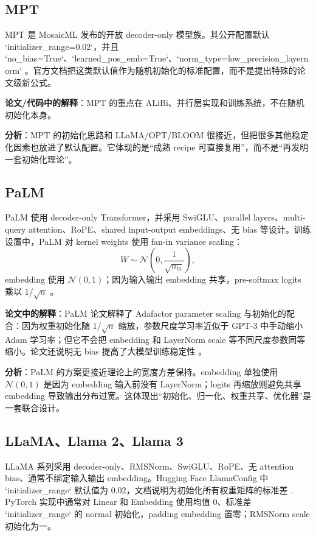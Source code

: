 \documentclass[UTF8,a4paper,11pt]{ctexart}
\newcommand{\Normal}{\mathcal{N}}
\begin{document}
\subsection{MPT}

MPT 是 MosaicML 发布的开放 decoder-only 模型族。其公开配置默认 `initializer\_range=0.02`，并且 `no\_bias=True`、`learned\_pos\_emb=True`、`norm\_type=low\_precision\_layernorm` \cite{mptdocs}。官方文档把这类默认值作为随机初始化的标准配置，而不是提出特殊的论文级新公式。

\textbf{论文/代码中的解释}：MPT 的重点在 ALiBi、并行层实现和训练系统，不在随机初始化本身。

\textbf{分析}：MPT 的初始化思路和 LLaMA/OPT/BLOOM 很接近，但把很多其他稳定化因素也放进了默认配置。它体现的是“成熟 recipe 可直接复用”，而不是“再发明一套初始化理论”。

\subsection{PaLM}

PaLM 使用 decoder-only Transformer，并采用 SwiGLU、parallel layers、multi-query attention、RoPE、shared input-output embeddings、无 bias 等设计。训练设置中，PaLM 对 kernel weights 使用 fan-in variance scaling：
\[
  W\sim \Normal\left(0,\frac{1}{\sqrt{n_{\mathrm{in}}}}\right),
\]
embedding 使用 $\Normal(0,1)$；因为输入输出 embedding 共享，pre-softmax logits 乘以 $1/\sqrt{n}$ \cite{palmpaper}。

\textbf{论文中的解释}：PaLM 论文解释了 Adafactor parameter scaling 与初始化的配合：因为权重初始化随 $1/\sqrt{n}$ 缩放，参数尺度学习率近似于 GPT-3 中手动缩小 Adam 学习率；但它不会把 embedding 和 LayerNorm scale 等不同尺度参数同等缩小。论文还说明无 bias 提高了大模型训练稳定性 \cite{palmpaper}。

\textbf{分析}：PaLM 的方案更接近理论上的宽度方差保持。embedding 单独使用 $\Normal(0,1)$ 是因为 embedding 输入前没有 LayerNorm；logits 再缩放则避免共享 embedding 导致输出分布过宽。这体现出“初始化、归一化、权重共享、优化器”是一套联合设计。

\subsection{LLaMA、Llama 2、Llama 3}

LLaMA 系列采用 decoder-only、RMSNorm、SwiGLU、RoPE、无 attention bias、通常不绑定输入输出 embedding。Hugging Face LlamaConfig 中 `initializer\_range` 默认值为 $0.02$，文档说明为初始化所有权重矩阵的标准差 \cite{llamadocs,llamapaper}. PyTorch 实现中通常对 Linear 和 Embedding 使用均值 0、标准差 `initializer\_range` 的 normal 初始化，padding embedding 置零；RMSNorm scale 初始化为一。
\end{document}
